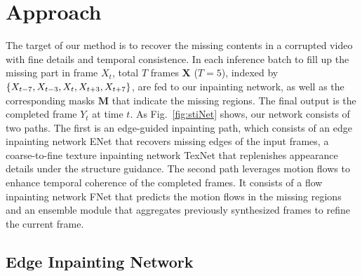 

\section{Approach}
\label{sec:approach}

The target of our method is to recover the missing contents in a corrupted video with fine details and temporal consistence.
%
In each inference batch to fill up the missing part in frame $X_t$, total $T$ frames $\boldsymbol{X}$ ($T=5$), indexed by $\{X_{t-7},X_{t-3},X_{t},X_{t+3},X_{t+7}\}$, are fed to our inpainting network, as well as the corresponding masks $\boldsymbol{M}$ that indicate the missing regions.
The final output is the completed frame \(Y_t\) at time $t$. 
As Fig.~\ref{fig:stiNet} shows, our network consists of two paths. 
The first is an edge-guided inpainting path, which consists of an edge inpainting network ENet that recovers missing edges of the input frames, a coarse-to-fine texture inpainting network TexNet that replenishes appearance details under the structure guidance.
The second path leverages motion flows to enhance temporal coherence of the completed frames.
It consists of a flow inpainting network FNet that predicts the motion flows in the missing regions and an ensemble module that aggregates previously synthesized frames to refine the current frame. 



\subsection{Edge Inpainting Network}
\label{sec:edgenet}
 
